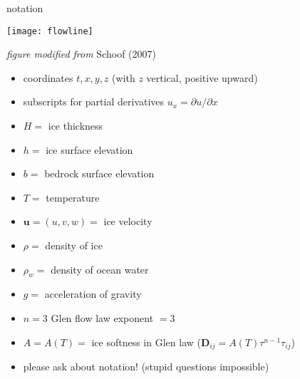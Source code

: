 \begin{comment}
\begin{frame}{outside of scope}

\large\emph{not} \normalsize covered here:\normalsize
\medskip

  \begin{itemize}
  \item Stokes and ``higher order'' flow equations
  \item thermomechanical coupling or polythermal ice
  \item subglacial hydrology/processes
  \item mass balance and snow/firn processes
  \item constitutive relations other than Glen isotropic
  \item grounding lines, calving fronts, ocean interaction
  \item paleo-climate and ``spin-up''
  \item earth deformation under ice sheet load
  \item other numerics: FEM, spectral, multigrid, parallel, \dots
  \item etc.
  \end{itemize}

\end{frame}
\end{comment}

\begin{frame}{notation} 

\begin{center}
  \texttt{[image: flowline]}

\tiny \emph{figure modified from} Schoof (2007)\nocite{SchoofMarine1}
\end{center}

\scriptsize
  \begin{itemize}
  \item coordinates $t,x,y,z$  (with $z$ vertical, positive upward)
  \item subscripts for partial derivatives $u_x = \partial u/\partial x$
  \item $H=$ ice thickness
  \item $h=$ ice surface elevation
  \item $b=$ bedrock surface elevation
  \item $T=$ temperature
  \item $\mathbf{u}=(u,v,w)=$ ice velocity
  \item $\rho=$ density of ice
  \item $\rho_w=$ density of ocean water
  \item $g=$ acceleration of gravity
  \item $n=3$ Glen flow law exponent $=3$
  \item $A=A(T)=$ ice softness in Glen law ($\mathbf{D}_{ij} = A(T) \tau^{n-1} \tau_{ij}$)
  \item \alert{please ask about notation!}  (stupid questions impossible)
  \end{itemize}

\end{frame}


